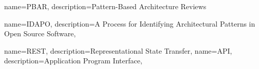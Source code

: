 

{
name={PBAR},
description={Pattern-Based Architecture Reviews}
}

{
name={IDAPO},
description={A Process for Identifying Architectural Patterns in Open Source Software},
}

{
name={REST},
description={Representational State Transfer},
}
{
name={API},
description={Application Program Interface},
}